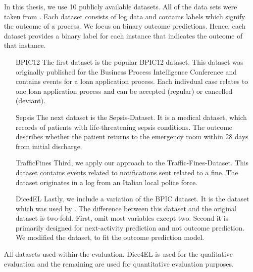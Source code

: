 \documentclass[./../../paper.tex]{subfiles}
\begin{document}
In this thesis, we use 10 publicly available datasets. All of the data sets were taken from \citeauthor{teinemaa_OutcomeOrientedPredictiveProcess_2018a}. Each dataset consists of log data and contains labels which signify the outcome of a process. We focus on binary outcome predictions. Hence, each dataset provides a binary label for each \gls{instance} that indicates the outcome of that \gls{instance}. 

\begin{enumerate}
    \item[BPIC12] The first dataset is the popular BPIC12 dataset. This dataset was originally published for the Business Process Intelligence Conference and contains events for a loan application process. Each indivdual case relates to one loan application process and can be accepted (regular) or cancelled (deviant).
    \item[Sepsis] The next dataset is the Sepsis-Dataset. It is a medical dataset, which records of patients with life-threatening sepsis conditions. The outcome describes whether the patient returns to the emergency room within 28 days from initial discharge.
    \item[TrafficFines] Third, we apply our approach to the Traffic-Fines-Dataset. This dataset contains events related to notifications sent related to a fine. The dataset originates in a log from an Italian local police force.
    \item[Dice4EL] Lastly, we include a variation of the BPIC dataset. It is the dataset which was used by \citeauthor{hsieh_DiCE4ELInterpretingProcess_2021}. The difference between this dataset and the original dataset is two-fold. First, \citeauthor{hsieh_DiCE4ELInterpretingProcess_2021} omit most variables except two. Second it is primarily designed for next-activity prediction and not outcome prediction. We modified the dataset, to fit the outcome prediction model.
\end{enumerate}

\begin{table}[htbp]
        \makebox[\linewidth]{
            
            }
            \caption{All datasets used within the evaluation. Dice4EL is used for the qualitative evaluation and the remaining are used for quantitative evaluation purposes.}
            \label{tbl:dataset-stats}
\end{table}
\end{document}
